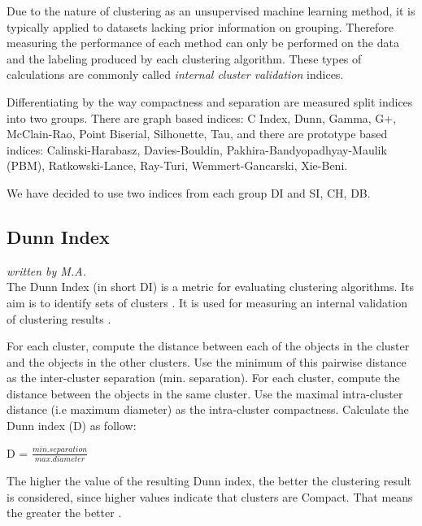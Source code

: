 Due to the nature of clustering as an unsupervised machine learning method, it is typically applied to datasets lacking prior information on grouping. Therefore measuring the performance of each method can only be performed on the data and the labeling produced by each clustering algorithm. These types of calculations are commonly called \textit{internal cluster validation} indices.

Differentiating by the way compactness and separation are measured \cite{balbi2016cosine} split indices into two groups. There are graph based indices: C Index, Dunn, Gamma, G+, McClain-Rao, Point Biserial, Silhouette, Tau, and there are prototype based indices: Calinski-Harabasz, Davies-Bouldin, Pakhira-Bandyopadhyay-Maulik (PBM), Ratkowski-Lance, Ray-Turi, Wemmert-Gancarski, Xie-Beni. 

We have decided to use two indices from each group \gls{DI} and \gls{SI}, \gls{CH}, \gls{DB}. 


\subsection{Dunn Index}
\textit{written by M.A.}\\


The Dunn Index (in short DI) is a metric for evaluating clustering algorithms. Its aim is to identify sets of clusters \cite{dunn2016rizzo}. It is used for measuring an internal validation of clustering results \cite{BENNCIR2021102751}. \newline

For each cluster, compute the distance between each of the objects in the cluster and the objects in the other clusters. Use the minimum of this pairwise distance as the inter-cluster separation (min. separation). For each cluster, compute the distance between the objects in the same cluster. Use the maximal intra-cluster distance (i.e maximum diameter) as the intra-cluster compactness. Calculate the Dunn index (D) as follow: \newline

D = $\frac{min.separation}{max.diameter}$ \cite{BENNCIR2021102751} \newline

The higher the value of the resulting Dunn index, the better the clustering
result is considered, since higher values indicate that clusters are Compact.
That means the greater the better \cite{dunnblog2019rizzo}. \newline


